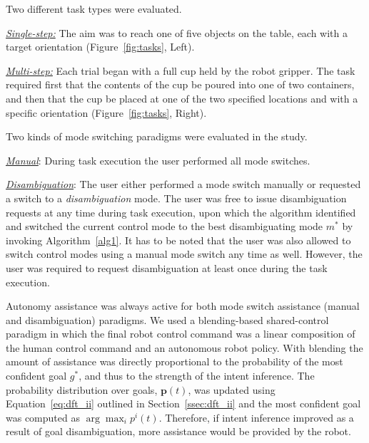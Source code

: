 \documentclass[journal]{IEEEtran}
\newcommand{\argmax}{\arg\!\max}
\begin{document}
 Two different task types were evaluated.

\underline{\textit{Single-step:}} The aim was to reach one of five objects on the table, each with a target orientation (Figure~\ref{fig:tasks}, Left). 

\underline{\textit{Multi-step:}} Each trial began with a full cup held by the robot gripper. The task required first that the contents of the cup be poured into one of two containers, and then that the cup be placed at one of the two specified locations and with a specific orientation (Figure~\ref{fig:tasks}, Right). 

 Two kinds of mode switching paradigms were evaluated in the study.

\underline{\textit{Manual}}: During task execution the user performed all mode switches. 

\underline{\textit{Disambiguation}}: The user either performed a mode switch manually or requested a switch to a \textit{disambiguation} mode. The user was free to issue disambiguation requests at any time during task execution, upon which the algorithm identified and switched the current control mode to the best disambiguating mode $m^*$ by invoking Algorithm~\ref{alg1}. It has to be noted that the user was also allowed to switch control modes using a manual mode switch any time as well. However, the user was required to request disambiguation at least once during the task execution. 


 Autonomy assistance was always active for both mode switch assistance (manual and disambiguation) paradigms. We used a blending-based shared-control paradigm in which the final robot control command was a linear composition of the human control command and an autonomous robot policy. With blending the amount of assistance was directly proportional to the probability of the most confident goal $g^*$, and thus to the strength of the intent inference. The probability distribution over goals, $\boldsymbol{p}(t)$, was updated using Equation~\ref{eq:dft_ii} outlined in Section~\ref{ssec:dft_ii} and the most confident goal was computed as $\argmax_i  p^i(t)$. Therefore, if intent inference improved as a result of goal disambiguation, more assistance would be provided by the robot.
\end{document}
